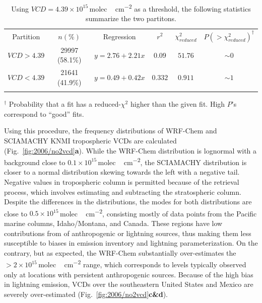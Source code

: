 	\begin{table}
		\begin{center}
		\begin{singlespacing}
		\caption[Linear regression on $NO_2$ VCDs]{Using $VCD=4.39\times10^{15}$\,\unit{molec.\,cm^{-2}} as a
		threshold, the following statistics summarize the two partitons.}
		\begin{tabular}{cccccc} \tophline
		Partition&  $n(\%)$ & Regression & $r^2$ & $\chi_{reduced}^2$ & $P(>\chi_{reduced}^2)^\dagger$ \\
		\middlehline
		$VCD>4.39$ & 29997 (58.1\%) & $y=2.76+2.21x$ & $0.09$ & $51.76$ & $\sim0$ \\
		$VCD<4.39$ & 21641 (41.9\%)  & $y=0.49+0.42x$ & $0.332$ & $0.911$ & $\sim1$ \\
		\bottomhline
		\end{tabular}
		\label{tab:2006/no2reg}
		\end{singlespacing}
		\end{center}
		{\footnotesize ${}^\dagger$ Probability that a fit has a reduced-$\chi^2$ higher than the given fit. High $P$'s correspond to ``good'' fits.}
	\end{table}

Using this procedure, the frequency distributions of WRF-Chem and SCIAMACHY KNMI  tropospheric VCDs
are calculated (Fig.~\ref{fig:2006/no2vcd}{\bf a}). While the WRF-Chem distribution is lognormal with a background close
to $0.1\times10^{15}$\,\unit{molec.\,cm^{-2}}, the SCIAMACHY distribution is closer to a normal distribution skewing towards
the left with a negative tail. Negative values in tropospheric column is permitted because of the retrieval process, which
involves estimating and subtracting the  stratospheric column. Despite the differences in the distributions, the modes
for both distributions are close to $0.5\times10^{15}$\,\unit{molec.\,cm^{-2}}, consisting mostly of data points from the Pacific
marine columns, Idaho/Montana, and Canada. These regions have low contributions from  of anthropogenic or 
lightning sources, thus making them less susceptible to biases in emission inventory and lightning parameterization. On the
contrary, but as expected, the WRF-Chem substantially over-estimates the $>2\times10^{15}$\,\unit{molec.\,cm^{-2}}
range, which corresponds to levels typically observed only at locations with persistent anthropogenic sources. Because of the
high bias in lightning emission,  VCDs over the southeastern United States and Mexico are severely over-estimated
(Fig.~\ref{fig:2006/no2vcd}{\bf c\&d}).

